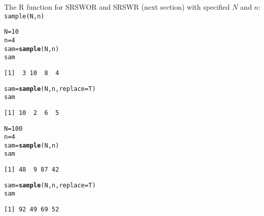 \documentclass[oneside]{book}\usepackage[]{graphicx}\usepackage[svgnames]{xcolor}
\makeatletter
\newcommand{\hlnum}[1]{\textcolor[rgb]{0.686,0.059,0.569}{#1}}%
\newcommand{\hlstd}[1]{\textcolor[rgb]{0.345,0.345,0.345}{#1}}%
\newcommand{\hlkwb}[1]{\textcolor[rgb]{0.69,0.353,0.396}{#1}}%
\newcommand{\hlkwc}[1]{\textcolor[rgb]{0.333,0.667,0.333}{#1}}%
\newcommand{\hlkwd}[1]{\textcolor[rgb]{0.737,0.353,0.396}{\textbf{#1}}}%
\newenvironment{kframe}{%
 \def\at@end@of@kframe{}%
 \ifinner\ifhmode%
  \def\at@end@of@kframe{\end{minipage}}%
  \begin{minipage}{\columnwidth}%
 \fi\fi%
 \def\FrameCommand##1{\hskip\@totalleftmargin \hskip-\fboxsep
 \colorbox{shadecolor}{##1}\hskip-\fboxsep
     \hskip-\linewidth \hskip-\@totalleftmargin \hskip\columnwidth}%
 \MakeFramed {\advance\hsize-\width
   \@totalleftmargin\z@ \linewidth\hsize
   \@setminipage}}%
 {\par\unskip\endMakeFramed%
 \at@end@of@kframe}
\newenvironment{knitrout}{}{} %
\makeatother
\begin{document}
\begin{Example}{}
      The R function for SRSWOR and SRSWR (next section) with
      specified $N$ and $n$: \texttt{sample(N,n)}
\begin{knitrout}
\color{fgcolor}\begin{kframe}
\begin{alltt}
\hlstd{N} \hlkwb{=} \hlnum{10}
\hlstd{n} \hlkwb{=} \hlnum{4}
\hlstd{sam} \hlkwb{=} \hlkwd{sample}\hlstd{(N, n)}
\hlstd{sam}
\end{alltt}
\begin{verbatim}
[1]  3 10  8  4
\end{verbatim}
\begin{alltt}
\hlstd{sam} \hlkwb{=} \hlkwd{sample}\hlstd{(N, n,} \hlkwc{replace} \hlstd{= T)}
\hlstd{sam}
\end{alltt}
\begin{verbatim}
[1] 10  2  6  5
\end{verbatim}
\begin{alltt}
\hlstd{N} \hlkwb{=} \hlnum{100}
\hlstd{n} \hlkwb{=} \hlnum{4}
\hlstd{sam} \hlkwb{=} \hlkwd{sample}\hlstd{(N, n)}
\hlstd{sam}
\end{alltt}
\begin{verbatim}
[1] 48  9 87 42
\end{verbatim}
\begin{alltt}
\hlstd{sam} \hlkwb{=} \hlkwd{sample}\hlstd{(N, n,} \hlkwc{replace} \hlstd{= T)}
\hlstd{sam}
\end{alltt}
\begin{verbatim}
[1] 92 49 69 52
\end{verbatim}
\end{kframe}
\end{knitrout}
\end{Example}
\end{document}
